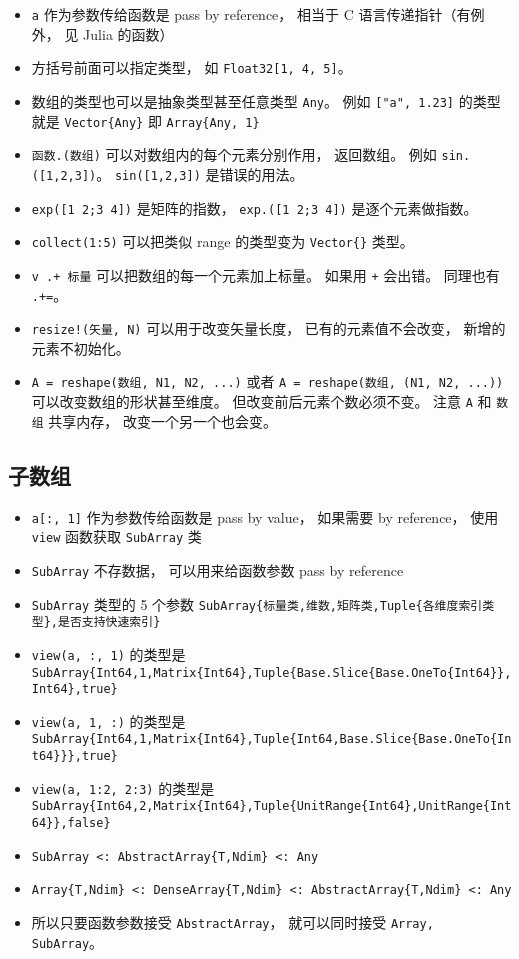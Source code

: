 \begin{itemize}
\item \verb|a| 作为参数传给函数是 pass by reference， 相当于 C 语言传递指针（有例外， 见 Julia 的函数）
\item 方括号前面可以指定类型， 如 \verb|Float32[1, 4, 5]|。
\item 数组的类型也可以是抽象类型甚至任意类型 \verb|Any|。 例如 \verb|["a", 1.23]| 的类型就是 \verb|Vector{Any}| 即 \verb|Array{Any, 1}|
\item \verb|函数.(数组)| 可以对数组内的每个元素分别作用， 返回数组。 例如 \verb|sin.([1,2,3])|。 \verb|sin([1,2,3])| 是错误的用法。
\item \verb|exp([1 2;3 4])| 是矩阵的指数， \verb|exp.([1 2;3 4])| 是逐个元素做指数。
\item \verb|collect(1:5)| 可以把类似 range 的类型变为 \verb|Vector{}| 类型。
\item \verb|v .+ 标量| 可以把数组的每一个元素加上标量。 如果用 \verb|+| 会出错。 同理也有 \verb|.+=|。
\item \verb|resize!(矢量, N)| 可以用于改变矢量长度， 已有的元素值不会改变， 新增的元素不初始化。
\item \verb|A = reshape(数组, N1, N2, ...)| 或者 \verb|A = reshape(数组, (N1, N2, ...))| 可以改变数组的形状甚至维度。 但改变前后元素个数必须不变。 注意 \verb|A| 和 \verb|数组| 共享内存， 改变一个另一个也会变。
\end{itemize}

\subsection{子数组}
\begin{itemize}
\item \verb|a[:, 1]| 作为参数传给函数是 pass by value， 如果需要 by reference， 使用 \verb|view| 函数获取 \verb|SubArray| 类
\item \verb|SubArray| 不存数据， 可以用来给函数参数 pass by reference
\item \verb|SubArray| 类型的 5 个参数 \verb|SubArray{标量类,维数,矩阵类,Tuple{各维度索引类型},是否支持快速索引}|
\item \verb|view(a, :, 1)| 的类型是 \verb|SubArray{Int64,1,Matrix{Int64},Tuple{Base.Slice{Base.OneTo{Int64}},Int64},true}|
\item \verb|view(a, 1, :)| 的类型是 \verb|SubArray{Int64,1,Matrix{Int64},Tuple{Int64,Base.Slice{Base.OneTo{Int64}}},true}|
\item \verb|view(a, 1:2, 2:3)| 的类型是 \verb|SubArray{Int64,2,Matrix{Int64},Tuple{UnitRange{Int64},UnitRange{Int64}},false}|
\item \verb|SubArray <: AbstractArray{T,Ndim} <: Any|
\item \verb|Array{T,Ndim} <: DenseArray{T,Ndim} <: AbstractArray{T,Ndim} <: Any|
\item 所以只要函数参数接受 \verb|AbstractArray|， 就可以同时接受 \verb|Array, SubArray|。
\end{itemize}

